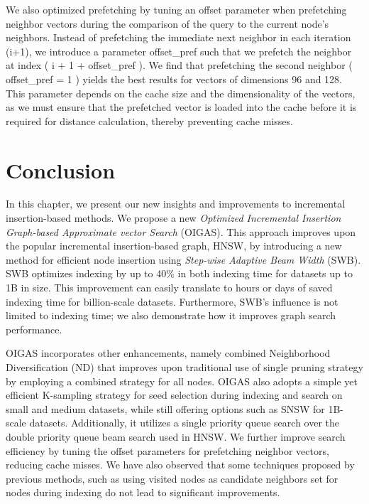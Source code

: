 We also optimized prefetching by tuning an offset parameter when prefetching neighbor vectors during the comparison of the query to the current node's neighbors. Instead of prefetching the immediate next neighbor in each iteration (i+1), we introduce a parameter offset\_pref such that we prefetch the neighbor at index ( i + 1 + offset\_pref ). We find that prefetching the second neighbor ( offset\_pref = 1 ) yields the best results for vectors of dimensions 96 and 128. This parameter depends on the cache size and the dimensionality of the vectors, as we must ensure that the prefetched vector is loaded into the cache before it is required for distance calculation, thereby preventing cache misses.

 
 \section{Conclusion}
In this chapter, we present our new insights and improvements to incremental insertion-based methods. We propose a new \textit{Optimized Incremental Insertion Graph-based Approximate vector Search} (OIGAS). This approach improves upon the popular incremental insertion-based graph, HNSW, by introducing a new method for efficient node insertion using \textit{Step-wise Adaptive Beam Width} (SWB). SWB optimizes indexing by up to 40\% in both indexing time for datasets up to 1B in size. This improvement can easily translate to hours or days of saved indexing time for billion-scale datasets. Furthermore, SWB's influence is not limited to indexing time; we also demonstrate how it improves graph search performance.

OIGAS incorporates other enhancements, namely combined Neighborhood Diversification (ND) that improves upon traditional use of single pruning strategy by employing a combined strategy for all nodes. OIGAS also adopts a simple yet efficient K-sampling strategy for seed selection during indexing and search on small and medium datasets, while still offering options such as SNSW for 1B-scale datasets. Additionally, it utilizes a single priority queue search over the double priority queue beam search used in HNSW. We further improve search efficiency by tuning the offset parameters for prefetching neighbor vectors, reducing cache misses. We have also observed that some techniques proposed by previous methods, such as using visited nodes as candidate neighbors set for nodes during indexing
do not lead to significant improvements.
